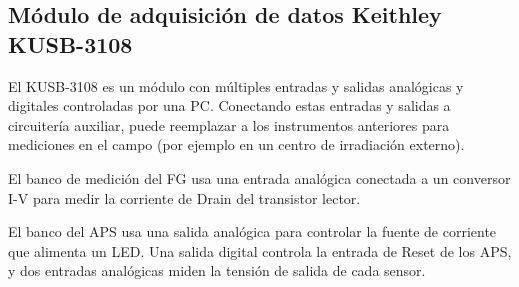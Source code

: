 \subsection{Módulo de adquisición de datos Keithley KUSB-3108}
El KUSB-3108 es un módulo con múltiples entradas y salidas 
analógicas y digitales controladas por una PC.
Conectando estas entradas y salidas a circuitería auxiliar,
puede reemplazar a los instrumentos anteriores para mediciones en el campo
(por ejemplo en un centro de irradiación externo).

El banco de medición del FG usa una entrada analógica conectada a un conversor
I-V para medir la corriente de Drain del transistor lector.

El banco del APS usa una salida analógica 
para controlar la fuente de corriente que alimenta un LED.
Una salida digital controla la entrada de Reset de los APS,
y dos entradas analógicas miden la tensión de salida de cada sensor.
